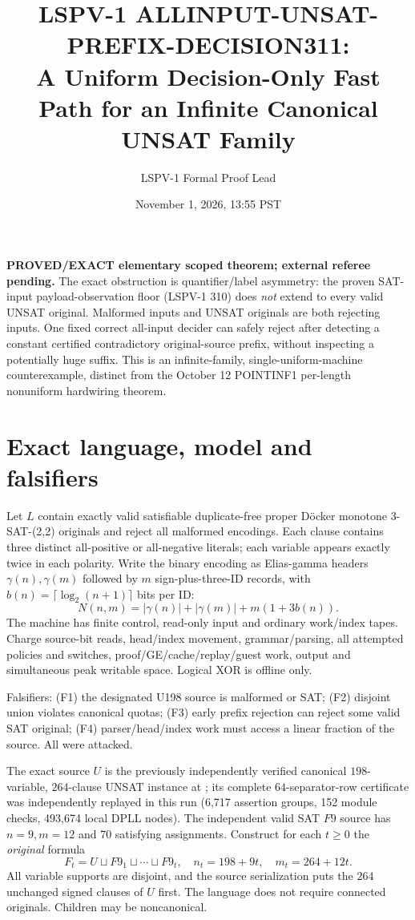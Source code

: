 \documentclass[11pt]{article}
\title{LSPV-1 ALLINPUT-UNSAT-PREFIX-DECISION311:\\A Uniform Decision-Only Fast Path for an Infinite Canonical UNSAT Family}
\author{LSPV-1 Formal Proof Lead}
\date{November 1, 2026, 13:55 PST}
\begin{document}
\maketitle
\noindent\textbf{PROVED/EXACT elementary scoped theorem; external referee pending.}
The exact obstruction is quantifier/label asymmetry: the proven SAT-input
payload-observation floor (LSPV-1 310) does \emph{not} extend to every valid
UNSAT original. Malformed inputs and UNSAT originals are both rejecting
inputs. One fixed correct all-input decider can safely reject after detecting
a constant certified contradictory original-source prefix, without inspecting
a potentially huge suffix. This is an infinite-family, single-uniform-machine
counterexample, distinct from the October 12 POINTINF1 per-length
nonuniform hardwiring theorem.

\section{Exact language, model and falsifiers}
Let $L$ contain exactly valid satisfiable duplicate-free proper D\"ocker
monotone 3-SAT-(2,2) originals and reject all malformed encodings.
Each clause contains three distinct all-positive or all-negative literals;
each variable appears exactly twice in each polarity. Write the binary
encoding as Elias-gamma headers $\gamma(n),\gamma(m)$ followed by $m$
sign-plus-three-ID records, with $b(n)=\lceil\log_2(n+1)\rceil$ bits per ID:
\[
N(n,m)=|\gamma(n)|+|\gamma(m)|+m(1+3b(n)).
\tag{1}
\]
The machine has finite control, read-only input and ordinary work/index
tapes. Charge source-bit reads, head/index movement, grammar/parsing,
all attempted policies and switches, proof/GE/cache/replay/guest work,
output and simultaneous peak writable space. Logical XOR is offline only.

Falsifiers: (F1) the designated U198 source is malformed or SAT;
(F2) disjoint union violates canonical quotas; (F3) early prefix rejection
can reject some valid SAT original; (F4) parser/head/index work must
access a linear fraction of the source. All were attacked.

The exact source $U$ is the previously independently verified canonical
$198$-variable, $264$-clause UNSAT instance at
; its complete $64$-separator-row
certificate was independently replayed in this run (6,717 assertion
groups, 152 module checks, 493,674 local DPLL nodes). The independent
valid SAT $F9$ source has $n=9,m=12$ and 70 satisfying assignments.
Construct for each $t\ge0$ the \emph{original} formula
\[
F_t=U\sqcup F9_1\sqcup\cdots\sqcup F9_t,\quad
n_t=198+9t,\quad m_t=264+12t.
\tag{2}
\]
All variable supports are disjoint, and the source serialization puts the
264 unchanged signed clauses of $U$ first. The language does not require
connected originals. Children may be noncanonical.
\end{document}
